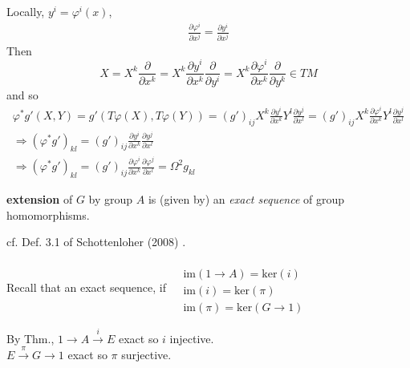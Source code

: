 Locally, $y^i = \varphi^i(x)$, \[
\begin{gathered}
	\frac{ \partial \varphi^i }{ \partial x^j} = \frac{ \partial y^i }{ \partial x^j}
\end{gathered}	
\]
Then
\[
X = X^k \frac{ \partial }{ \partial x^k} = X^k \frac{ \partial y^i }{ \partial x^k} \frac{ \partial }{ \partial y^i } = X^k \frac{ \partial \varphi^i }{ \partial x^k} \frac{ \partial }{ \partial y^k} \in TM
\]
and so 
\[
\begin{gathered}
	\varphi^* g'(X,Y) = g'(T\varphi(X), T\varphi(Y)) = (g')_{ij} X^k \frac{ \partial y^i }{ \partial x^k} Y^l \frac{ \partial y^j }{ \partial x^l} = (g')_{ij} X^k \frac{ \partial \varphi^i }{ \partial x^k } Y^l \frac{ \partial y^j}{ \partial x^l} \\ 
\Longrightarrow (\varphi^* g')_{kl} = (g')_{ij} \frac{ \partial y^i }{ \partial x^k } \frac{ \partial y^j}{ \partial x^l } \\ 
\Longrightarrow (\varphi^* g')_{kl} = (g')_{ij} \frac{ \partial \varphi^i }{ \partial x^k} \frac{ \partial \varphi^j}{ \partial x^l} = \Omega^2 g_{kl}
\end{gathered}
\]




\begin{definition}
	\textbf{extension} of $G$ by group $A$ is (given by) an \emph{exact sequence} of group homomorphisms.  
\end{definition}
cf. Def. 3.1 of Schottenloher (2008)  \cite{agat:Scho2008}.  

Recall that an exact sequence, if $\begin{aligned} & \quad \\
	& \text{im}(1\to A) = \text{ker}(i) \\
	& \text{im}(i) = \text{ker}(\pi) \\
	& \text{im}(\pi) = \text{ker}(G\to 1)
\end{aligned}$

By Thm., 
$1\to A \xrightarrow{i} E$ exact so $i$ injective.  \\
$E\xrightarrow{\pi} G \to 1$ exact so $\pi$ surjective.  

